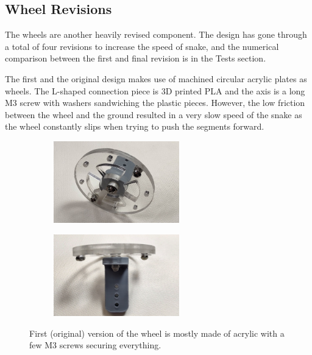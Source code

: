 \documentclass[twoside, 11pt]{article}
\begin{document}
\subsection{Wheel Revisions}
The wheels are another heavily revised component. The design has gone through a total of four revisions to increase the speed of snake, and the numerical comparison between the first and final revision is in the Tests section. 

The first and the original design makes use of machined circular acrylic plates as wheels. The L-shaped connection piece is 3D printed PLA and the axis is a long M3 screw with washers sandwiching the plastic pieces. However, the low friction between the wheel and the ground resulted in a very slow speed of the snake as the wheel constantly slips when trying to push the segments forward.
 
\begin{figure} [H]
\centering
\begin{subfigure}[b]{0.5\linewidth}
		\centering
		\includegraphics[width=0.6\textwidth]{wheel1side}
		\subcaption{}
	\end{subfigure}%
	\begin{subfigure}[b]{0.5\linewidth}
		\centering		
		\includegraphics[width=0.6\textwidth]{wheel1top}
		\subcaption{}
	\end{subfigure}
	\caption{First (original) version of the wheel is mostly made of acrylic with a few M3 screws securing everything.}
\end{figure}
\end{document}
